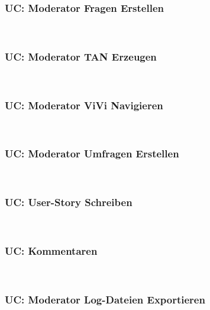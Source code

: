 \subsubsection{UC: Moderator Fragen Erstellen}

\\[0.5cm]
\pagebreak

\subsubsection{UC: Moderator TAN Erzeugen}

\\[0.5cm]
\pagebreak

\subsubsection{UC: Moderator ViVi Navigieren}

\\[0.5cm]
\pagebreak

\subsubsection{UC: Moderator Umfragen Erstellen}

\\[0.5cm]
\pagebreak

\subsubsection{UC: User-Story Schreiben}

\\[0.5cm]
\pagebreak

\subsubsection{UC: Kommentaren}

\\[0.5cm]
\pagebreak

\subsubsection{UC: Moderator Log-Dateien Exportieren}

\pagebreak